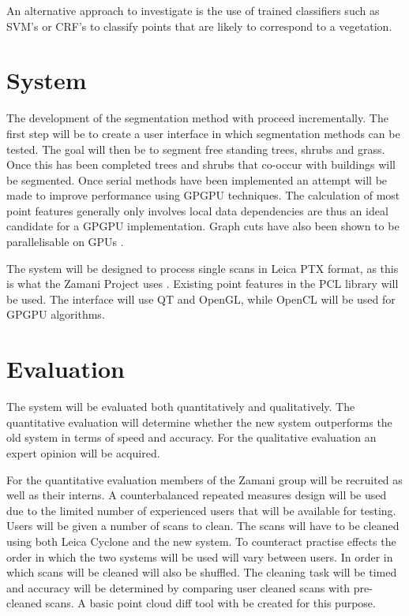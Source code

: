 \documentclass[10pt,twocolumn]{article}
\begin{document}
An alternative approach to investigate is the use of trained classifiers such as SVM's or CRF's to classify points that are likely to correspond to a vegetation.


\section{System}

The development of the segmentation method with proceed incrementally. The first step will be to create a user interface in which segmentation methods can be tested. The goal will then be to segment free standing trees, shrubs and grass. Once this has been completed trees and shrubs that co-occur with buildings will be segmented. Once serial methods have been implemented an attempt will be made to improve performance using GPGPU techniques. The calculation of most point features generally only involves local data dependencies are thus an ideal candidate for a GPGPU implementation. Graph cuts have also been shown to be parallelisable on GPUs \cite{Hussein2007}.

The system will be designed to process single scans in Leica PTX format, as this is what the Zamani Project uses \cite{Held2012}. Existing point features in the PCL library \cite{Rusu2011} will be used. The interface will use QT and OpenGL, while OpenCL will be used for GPGPU algorithms.

\section{Evaluation}

The system will be evaluated both quantitatively and qualitatively. The quantitative evaluation will determine whether the new system outperforms the old system in terms of speed and accuracy. For the qualitative evaluation an expert opinion will be acquired.

For the quantitative evaluation members of the Zamani group will be recruited as well as their interns. A counterbalanced repeated measures design will be used due to the limited number of experienced users that will be available for testing. Users will be given a number of scans to clean. The scans will have to be cleaned using both Leica Cyclone and the new system. To counteract practise effects the order in which the two systems will be used will vary between users. In order in which scans will be cleaned will also be shuffled. The cleaning task will be timed and accuracy will be determined by comparing user cleaned scans with pre-cleaned scans. A basic point cloud diff tool with be created for this purpose.
\end{document}
